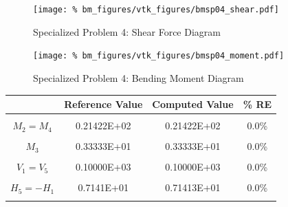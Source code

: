 \begin{figure}[!htb]
    \texttt{[image: \%
                     bm\_figures/vtk\_figures/bmsp04\_shear.pdf]}
    \centering
    \caption{Specialized Problem 4: Shear Force Diagram}
    \label{fig:bmsp04_shear}
\end{figure}
\begin{figure}[!htb]
    \texttt{[image: \%
                     bm\_figures/vtk\_figures/bmsp04\_moment.pdf]}
    \centering
    \caption{Specialized Problem 4: Bending Moment Diagram}
    \label{fig:bmsp04_moment}
\end{figure}
\begin{table}[h!]
\centering
\begin{tabular}{ c| c c c }
    & Reference Value & Computed Value & \% RE \\ \hline \\
    $M_{2}=M_{4}$     & 0.21422E+02 & 0.21422E+02 & 0.0\% \\ \\
    $M_{3}$           & 0.33333E+01 & 0.33333E+01 & 0.0\% \\ \\
    $V_{1}=V_{5}$     & 0.10000E+03 & 0.10000E+03 & 0.0\% \\ \\
    $H_{5}=-H_{1}$    & 0.7141E+01 & 0.71413E+01 & 0.0\% \\ \\
\end{tabular}
\end{table}

